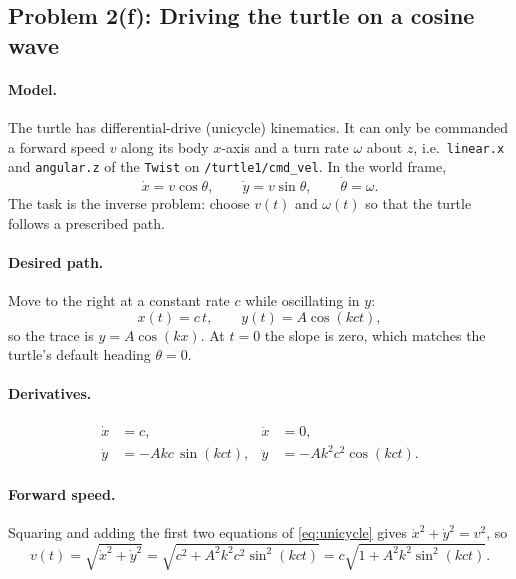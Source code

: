 \subsection*{Problem 2(f): Driving the turtle on a cosine wave}

\paragraph{Model.} The turtle has differential-drive (unicycle) kinematics. It can only be
commanded a forward speed $v$ along its body $x$-axis and a turn rate $\omega$ about $z$,
i.e.\ \texttt{linear.x} and \texttt{angular.z} of the \texttt{Twist} on
\texttt{/turtle1/cmd\_vel}. In the world frame,
\begin{equation}
  \dot{x} = v\cos\theta, \qquad \dot{y} = v\sin\theta, \qquad \dot{\theta} = \omega .
  \label{eq:unicycle}
\end{equation}
The task is the inverse problem: choose $v(t)$ and $\omega(t)$ so that the turtle follows a
prescribed path.

\paragraph{Desired path.} Move to the right at a constant rate $c$ while oscillating in $y$:
\begin{equation}
  x(t) = c\,t, \qquad y(t) = A\cos(kct),
\end{equation}
so the trace is $y = A\cos(kx)$. At $t=0$ the slope is zero, which matches the turtle's
default heading $\theta = 0$.

\paragraph{Derivatives.}
\begin{align}
  \dot{x} &= c, & \ddot{x} &= 0, \\
  \dot{y} &= -Akc\,\sin(kct), & \ddot{y} &= -Ak^{2}c^{2}\cos(kct).
\end{align}

\paragraph{Forward speed.} Squaring and adding the first two equations of \eqref{eq:unicycle}
gives $\dot{x}^2+\dot{y}^2 = v^2$, so
\begin{equation}
  v(t) = \sqrt{\dot{x}^{2}+\dot{y}^{2}}
       = \sqrt{c^{2} + A^{2}k^{2}c^{2}\sin^{2}(kct)}
       = c\sqrt{1 + A^{2}k^{2}\sin^{2}(kct)} .
\end{equation}


